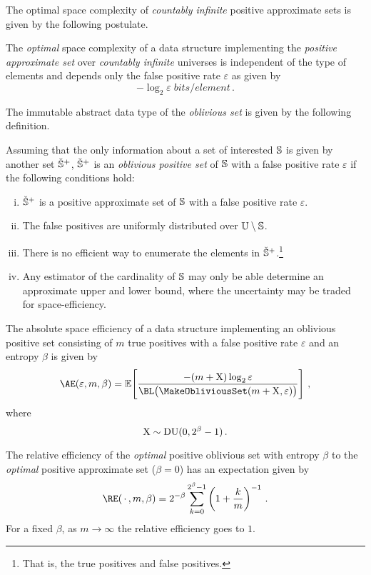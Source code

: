 \documentclass[ ../main.tex]{subfiles}
\begin{document}
The optimal space complexity of \emph{countably infinite} positive approximate sets is given by the following postulate.
\begin{postulate}
The \emph{optimal} space complexity of a data structure implementing the \emph{positive approximate set} over \emph{countably infinite} universes is independent of the type of elements and depends only the false positive rate $\varepsilon$ as given by
\begin{equation}
    -\log_2 \varepsilon \; \si{bits \per element}\,.
\end{equation}
\end{postulate}

The immutable abstract data type of the \emph{oblivious set}\cite{obset} is given by the following definition.
\begin{definition}
\label{def:obliviousset}
Assuming that the only information about a set of interested $\mathbb{S}$ is given by another set $\check{\mathbb{S}}^+$, $\check{\mathbb{S}}^+$ is an \emph{oblivious positive set} of $\mathbb{S}$ with a false positive rate $\varepsilon$ if the following conditions hold:
\begin{enumerate}[(i)]
    \item $\check{\mathbb{S}}^+$ is a positive approximate set of $\mathbb{S}$ with a false positive rate $\varepsilon$.
    \item The false positives are uniformly distributed over $\mathbb{U} \setminus \mathbb{S}$.
    \item There is no efficient way to enumerate the elements in $\check{\mathbb{S}}^+$.\footnote{That is, the true positives and false positives.}
    \item Any estimator of the cardinality of $\mathbb{S}$ may only be able determine an approximate upper and lower bound, where the uncertainty may be traded for space-efficiency.
\end{enumerate}
\end{definition}

The absolute space efficiency of a data structure implementing an oblivious positive set consisting of $m$ true positives with a false positive rate $\varepsilon$ and an entropy $\beta$ is given by
\begin{equation}
    \AE(\varepsilon, m, \beta) = \expectation\!\left[\frac{-(m + \rv{X}) \log_2 \varepsilon}{\BL\!\left(\MakeObliviousSet(m + \rv{X},\varepsilon)\right)}\right]\,,
\end{equation}
where
\begin{equation}
    \mathrm{X} \sim \operatorname{\rm{DU}}(0,2^\beta - 1)\,.
\end{equation}

The relative efficiency of the \emph{optimal} positive oblivious set with entropy $\beta$ to the \emph{optimal} positive approximate set ($\beta = 0$) has an expectation given by
\begin{equation}
    \RE(\,\cdot\,, m, \beta) = 2^{-\beta} \sum_{k=0}^{2^\beta-1} \left(1 + \frac{k}{m}\right)^{-1}\,.
\end{equation}
For a fixed $\beta$, as $m \to \infty$ the relative efficiency goes to $1$.
\end{document}
